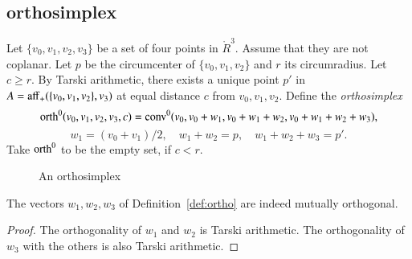 \subsection{orthosimplex}
%



\begin{definition}[orth] 
Let $\{v_0,v_1,v_2,v_3\}$ be a set of four points in $\ring{R}^3$.
Assume that they are not coplanar.  Let $p$ be the circumcenter
of $\{v_0,v_1,v_2\}$ and $r$ its circumradius.  Let $c\ge r$.
By Tarski arithmetic, %
there exists a unique point $p'$ in $A={\operatorname{aff}}_+(\{v_0,v_1,v_2\},v_3)$ at equal distance $c$
from $v_0,v_1,v_2$.  Define the {\it orthosimplex}
%
%
$$
    {\operatorname{orth}}^0(v_0,v_1,v_2,v_3,c) = 
   {\operatorname{conv}}^0(v_0,v_0+w_1,v_0+w_1+w_2,v_0+w_1+w_2+w_3),
$$
$$
     w_1=(v_0+v_1)/2,\quad w_1+w_2=p,\quad w_1+w_2+w_3=p'.
$$
Take ${\operatorname{orth}}^0$ to be the empty set, if $c< r$.
%
\end{definition}


\begin{figure}[htb]
  \centering
  \caption{An orthosimplex}
\end{figure}


\begin{lemma} The vectors $w_1,w_2,w_3$ of Definition~\ref{def:ortho}
are indeed mutually orthogonal.
%
\end{lemma}

\begin{proof} The orthogonality of $w_1$ and $w_2$ is 
Tarski arithmetic. %
The orthogonality of $w_3$ with the others is also Tarski arithmetic. %
\end{proof}
%


